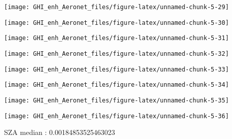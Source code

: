 \documentclass[
  10pt,
  a4paper,oneside]{article}
\begin{document}
\begin{center}\texttt{[image: GHI\_enh\_Aeronet\_files/figure-latex/unnamed-chunk-5-29]} \end{center}

\begin{center}\texttt{[image: GHI\_enh\_Aeronet\_files/figure-latex/unnamed-chunk-5-30]} \end{center}

\begin{center}\texttt{[image: GHI\_enh\_Aeronet\_files/figure-latex/unnamed-chunk-5-31]} \end{center}

\begin{center}\texttt{[image: GHI\_enh\_Aeronet\_files/figure-latex/unnamed-chunk-5-32]} \end{center}

\begin{center}\texttt{[image: GHI\_enh\_Aeronet\_files/figure-latex/unnamed-chunk-5-33]} \end{center}

\begin{center}\texttt{[image: GHI\_enh\_Aeronet\_files/figure-latex/unnamed-chunk-5-34]} \end{center}

\begin{center}\texttt{[image: GHI\_enh\_Aeronet\_files/figure-latex/unnamed-chunk-5-35]} \end{center}

\begin{center}\texttt{[image: GHI\_enh\_Aeronet\_files/figure-latex/unnamed-chunk-5-36]} \end{center}

SZA median : 0.00184853525463023
\end{document}
